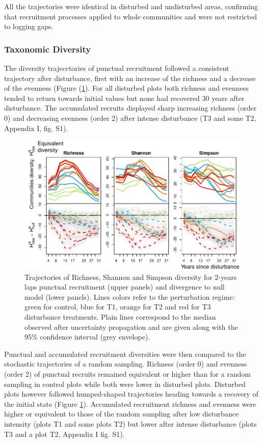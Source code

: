 \documentclass[fleqn,10pt]{ArtEcoFoG} %
\begin{document}
All the trajectories were identical in disturbed and undisturbed areas,
confirming that recruitment processes applied to whole communities and
were not restricted to logging gaps.

\subsubsection{Taxonomic Diversity}\label{taxonomic-diversity}

The diversity trajecctories of punctual recruitment followed a
consistent trajectory after disturbance, first with an increase of the
richness and a decrease of the evenness (Figure (\ref{fig:DivTraj}). For
all disturbed plots both richness and evenness tended to return towards
initial values but none had recovered 30 years after disturbance. The
accumulated recruits displayed sharp increasing richness (order 0) and
decreasing evenness (order 2) after intense disturbance (T3 and some T2,
Appendix I, fig. S1).

\begin{figure}

{\centering \includegraphics[width=0.8\linewidth]{RecruitmentTrajectories_files/figure-latex/DivTraj-1} 

}

\caption{Trajectories of Richness, Shannon and Simpson diversity for 2-years laps punctual  recruitment (upper panels) and divergence to null model (lower panels). Lines colors refer to the perturbation regime: green for control, blue for T1, orange for T2 and red for T3 disturbance treatments. Plain lines correspond to the median observed after uncertainty propagation and are given along with the 95\% confidence interval (grey envelope).}\label{fig:DivTraj}
\end{figure}

Punctual and accumulated recruitment diversities were then compared to
the stochastic trajectories of a random sampling. Richness (order 0) and
evenness (order 2) of punctual recruits remained equivalent or higher
than for a random sampling in control plots while both were lower in
disturbed plots. Disturbed plots however followed humped-shaped
trajectories heading towards a recovery of the initial state (Figure
\ref{fig:DivTraj}). Accumulated recruitment richness and evenness were
higher or equivalent to those of the random sampling after low
disturbance intensity (plots T1 and some plots T2) but lower after
intense disturbance (plots T3 and a plot T2, Appendix I fig. S1).
\end{document}
